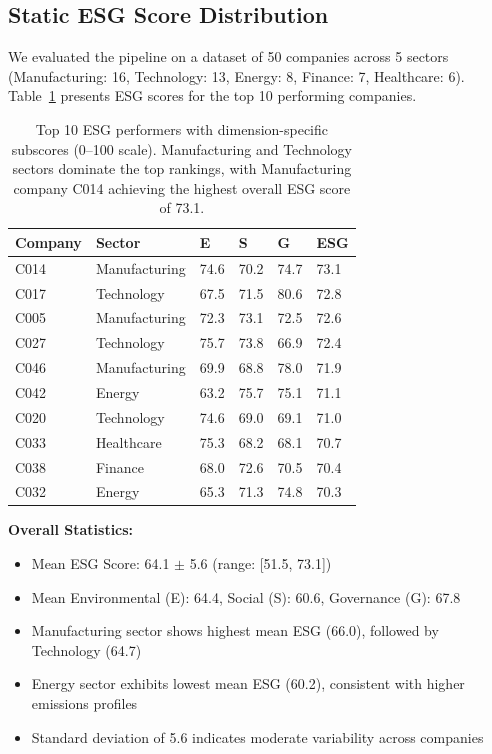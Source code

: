 \subsection{Static ESG Score Distribution}

We evaluated the pipeline on a dataset of 50 companies across 5 sectors (Manufacturing: 16, Technology: 13, Energy: 8, Finance: 7, Healthcare: 6). Table~\ref{tab:esg_scores} presents ESG scores for the top 10 performing companies.

\begin{table}[h!]
\centering
\small
 \begin{tabular}{p{2.5cm} p{2cm} p{1.2cm} p{1.2cm} p{1.2cm} p{1.5cm}}
 \hline
 \textbf{Company} & \textbf{Sector} & \textbf{E} & \textbf{S} & \textbf{G} & \textbf{ESG} \\ [0.5ex]
 \hline
 C014 & Manufacturing & 74.6 & 70.2 & 74.7 & 73.1 \\
 C017 & Technology & 67.5 & 71.5 & 80.6 & 72.8 \\
 C005 & Manufacturing & 72.3 & 73.1 & 72.5 & 72.6 \\
 C027 & Technology & 75.7 & 73.8 & 66.9 & 72.4 \\
 C046 & Manufacturing & 69.9 & 68.8 & 78.0 & 71.9 \\
 C042 & Energy & 63.2 & 75.7 & 75.1 & 71.1 \\
 C020 & Technology & 74.6 & 69.0 & 69.1 & 71.0 \\
 C033 & Healthcare & 75.3 & 68.2 & 68.1 & 70.7 \\
 C038 & Finance & 68.0 & 72.6 & 70.5 & 70.4 \\
 C032 & Energy & 65.3 & 71.3 & 74.8 & 70.3 \\ [0.5ex]
 \hline
 \end{tabular}
 \caption{\label{tab:esg_scores}Top 10 ESG performers with dimension-specific subscores (0–100 scale). Manufacturing and Technology sectors dominate the top rankings, with Manufacturing company C014 achieving the highest overall ESG score of 73.1.}
\end{table}

\textbf{Overall Statistics:}
\begin{itemize}
\item Mean ESG Score: 64.1 $\pm$ 5.6 (range: [51.5, 73.1])
\item Mean Environmental (E): 64.4, Social (S): 60.6, Governance (G): 67.8
\item Manufacturing sector shows highest mean ESG (66.0), followed by Technology (64.7)
\item Energy sector exhibits lowest mean ESG (60.2), consistent with higher emissions profiles
\item Standard deviation of 5.6 indicates moderate variability across companies
\end{itemize}

